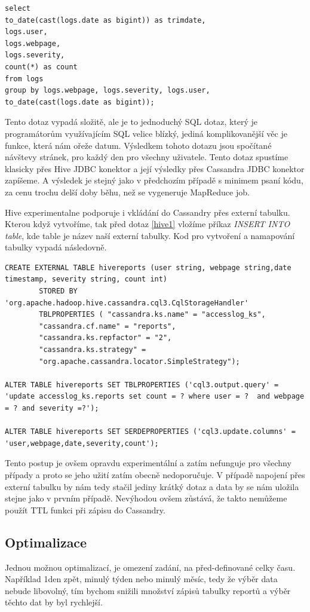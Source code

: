 \begin{lstlisting}[caption={Tabulka pro ukládání reportů},label=Hive1]
select 
to_date(cast(logs.date as bigint)) as trimdate,
logs.user,
logs.webpage,
logs.severity, 
count(*) as count
from logs 
group by logs.webpage, logs.severity, logs.user,
to_date(cast(logs.date as bigint));
\end{lstlisting}

Tento dotaz vypadá složitě, ale je to jednoduchý SQL dotaz, který je programátorům využívajícím SQL velice blízký, jediná komplikovanější věc je funkce, která nám ořeže datum. Výsledkem tohoto dotazu jsou spočítané návštevy stránek, pro každý den pro všechny uživatele. Tento dotaz spustíme klasicky přes Hive JDBC konektor a její výsledky přes Cassandra JDBC konektor zapíšeme. A výsledek je stejný jako v předchozím případě s minimem psaní kódu, za cenu trochu delší doby běhu, než se vygeneruje MapReduce job. 

Hive experimentalne podporuje i vkládání do Cassandry přes externí tabulku. Kterou když vytvoříme, tak před dotaz \ref{hive1} vložíme příkaz \emph{INSERT INTO table}, kde table je název naší externí tabulky. Kod pro vytvoření a namapování tabulky vypadá následovně. 
\begin{lstlisting}[caption={Vytvoření externí tabulky napojené na tabulku v CQL},label=Hive2]
CREATE EXTERNAL TABLE hivereports (user string, webpage string,date timestamp, severity string, count int)
        STORED BY 'org.apache.hadoop.hive.cassandra.cql3.CqlStorageHandler'
        TBLPROPERTIES ( "cassandra.ks.name" = "accesslog_ks",
        "cassandra.cf.name" = "reports",
        "cassandra.ks.repfactor" = "2",
        "cassandra.ks.strategy" =
        "org.apache.cassandra.locator.SimpleStrategy");
		
ALTER TABLE hivereports SET TBLPROPERTIES ('cql3.output.query' = 'update accesslog_ks.reports set count = ? where user = ?  and webpage = ? and severity =?');
		
ALTER TABLE hivereports SET SERDEPROPERTIES ('cql3.update.columns' = 'user,webpage,date,severity,count');
\end{lstlisting}
Tento postup je ovšem opravdu experimentální a zatím nefunguje pro všechny případy a proto se jeho užití zatím obecně nedoporučuje. V případě napojení přes externí tabulku by nám tedy stačil jediny krátký dotaz a data by se nám uložila stejne jako v prvním případě. Nevýhodou ovšem zůstává, že takto nemůžeme použít TTL funkci při zápisu do Cassandry.

\subsection{Optimalizace}
Jednou možnou optimalizací, je omezení zadání, na před-definované celky času. Například 1den zpět, minulý týden nebo minulý měsíc, tedy že výběr data nebude libovolný, tím bychom snižili množství zápisů tabulky reportů a výběr těchto dat by byl rychlejší. 

